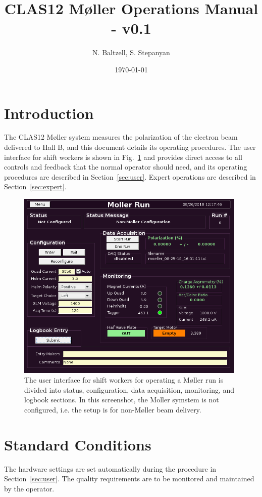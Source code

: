 \documentclass[amsmath,amssymb,notitlepage,12pt]{revtex4}
\begin{document}
\title{CLAS12 M{\o}ller Operations Manual - v0.1}
\date{\today}
\author{N. Baltzell, S. Stepanyan}
\begin{abstract}
\end{abstract}

\maketitle

\section{Introduction}
The CLAS12 M{\o}ller system measures the polarization of the electron beam delivered to Hall B, and this document details its operating procedures.  The user interface for shift workers is shown in Fig.~\ref{fig:unconfig} and provides direct access to all controls and feedback that the normal operator should need, and its operating procedures are described in Section~\ref{sec:user}.  Expert operations are described in Section~\ref{sec:expert}.

\begin{figure}[htbp]\centering
    \includegraphics[width=11cm]{pics/unconfig}
    \caption{The user interface for shift workers for operating a M{\o}ller run is divided into status, configuration, data acquisition, monitoring, and logbook sections.  In this screenshot, the Moller symstem is not configured, i.e. the setup is for non-M{\o}ller beam delivery.\label{fig:unconfig}}
\end{figure}

\section{Standard Conditions}
The hardware settings are set automatically during the procedure in Section~\ref{sec:user}.  The quality requirements are to be monitored and maintained by the operator.
\end{document}
